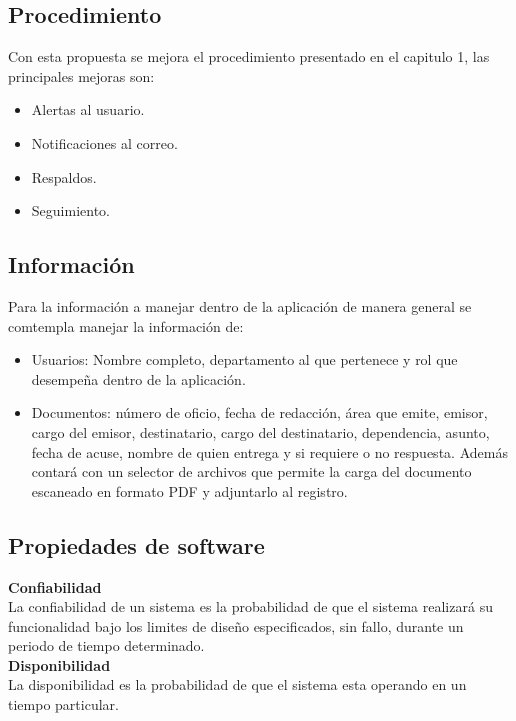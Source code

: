 \subsection{Procedimiento}
Con esta propuesta se mejora el procedimiento presentado en el capitulo 1, las principales mejoras son:
\begin{itemize}
	\item Alertas al usuario.
	\item Notificaciones al correo.
	\item Respaldos.
	\item Seguimiento.
\end{itemize}


\subsection{Información}

Para la información a manejar dentro de la aplicación de manera general se comtempla manejar la información de:
\begin{itemize}
	\item Usuarios: Nombre completo, departamento al que pertenece y rol que desempeña dentro de la aplicación.
	\item Documentos: número de oficio, fecha de redacción, área que emite, emisor, cargo del emisor, destinatario, cargo del destinatario, dependencia, asunto, fecha de acuse, nombre de quien entrega y si requiere o no respuesta. Además contará con un selector de archivos que permite la carga del documento escaneado en formato PDF y adjuntarlo al registro.
\end{itemize}

\subsection{Propiedades de software}

\textbf{Confiabilidad\\}
La confiabilidad de un sistema es la probabilidad de que el sistema realizará su funcionalidad bajo los limites de diseño especificados, sin fallo, durante un periodo de tiempo determinado. \\

\textbf{Disponibilidad\\}
La disponibilidad es la probabilidad de que el sistema esta operando en un tiempo particular.\\ 

